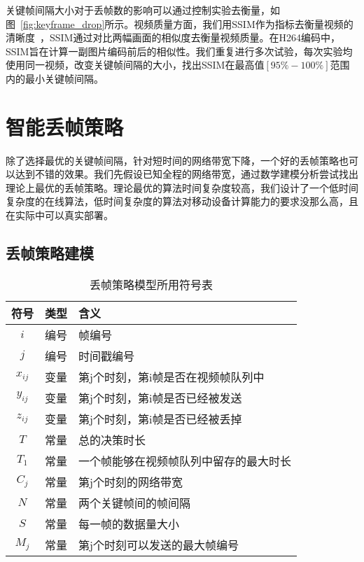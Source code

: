 关键帧间隔大小对于丢帧数的影响可以通过控制实验去衡量，如图~\ref{fig:keyframe_drop}所示。视频质量方面，我们用SSIM作为指标去衡量视频的清晰度~\cite{hore2010image}，SSIM通过对比两幅画面的相似度去衡量视频质量。在H264编码中，SSIM旨在计算一副图片编码前后的相似性。我们重复进行多次试验，每次实验均使用同一视频，改变关键帧间隔的大小，找出SSIM在最高值$[95\%-100\%]$范围内的最小关键帧间隔。

\section{智能丢帧策略}
除了选择最优的关键帧间隔，针对短时间的网络带宽下降，一个好的丢帧策略也可以达到不错的效果。我们先假设已知全程的网络带宽，通过数学建模分析尝试找出理论上最优的丢帧策略。理论最优的算法时间复杂度较高，我们设计了一个低时间复杂度的在线算法，低时间复杂度的算法对移动设备计算能力的要求没那么高，且在实际中可以真实部署。

\subsection{丢帧策略建模}

\begin{table}[tb]
\footnotesize
\centering
\caption{丢帧策略模型所用符号表}
\label{ip_var}
{\setlength{\tabcolsep}{3pt}
\begin{tabular}{|c|c|l|}
\hline
\textbf{符号} & \textbf{类型} & \textbf{含义}                      \\ \hline
$i$               & 编号         & 帧编号                           \\ \hline
$j$               & 编号         & 时间戳编号                            \\ \hline
$x_{ij}$             & 变量      & 第j个时刻，第i帧是否在视频帧队列中\\ \hline
$y_{ij}$             & 变量      & 第j个时刻，第i帧是否已经被发送     \\ \hline
$z_{ij}$             & 变量      & 第j个时刻，第i帧是否已经被丢掉  \\ \hline
$T$               & 常量         &  总的决策时长                        \\ \hline
$T_1$             & 常量       & 一个帧能够在视频帧队列中留存的最大时长 \\ \hline
$C_j$              & 常量         & 第j个时刻的网络带宽  \\ \hline
$N$               & 常量         & 两个关键帧间的帧间隔                      \\ \hline
$S$            & 常量         & 每一帧的数据量大小                       \\ \hline
$M_{j}$       & 常量         & 第j个时刻可以发送的最大帧编号 \\ \hline
\end{tabular}}
\end{table}

